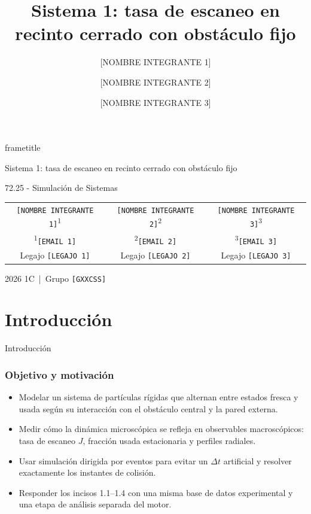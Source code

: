 \documentclass{beamer}
\title[Sistema 1 - tasa de escaneo]{Sistema 1: tasa de escaneo en recinto cerrado con obst\'aculo fijo}
\author[NOMBRE 1 - NOMBRE 2 - NOMBRE 3]{[NOMBRE INTEGRANTE 1] \and [NOMBRE INTEGRANTE 2] \and [NOMBRE INTEGRANTE 3]}
\institute[Instituto Tecnol\'ogico de Buenos Aires]{Instituto Tecnol\'ogico de Buenos Aires}
\date{}
\newcommand{\placeholder}[1]{\textcolor{tpblue}{\texttt{[#1]}}}
\newcommand{\sectiondivider}[1]{
  \begin{frame}[plain]
    \begin{center}
      \vspace{2.0cm}
      {\color{tpblue}\fontsize{23}{28}\selectfont #1\par}
    \end{center}
  \end{frame}
}
\begin{document}
\begin{frame}
  \begin{center}
    \vspace{0.05cm}
    \begin{beamercolorbox}[wd=0.85\paperwidth,sep=0.8ex,center]{frametitle}
      {\Large Sistema 1: tasa de escaneo en recinto cerrado con obst\'aculo fijo\par}
      \vspace{0.1cm}
      {\large 72.25 - Simulaci\'on de Sistemas\par}
    \end{beamercolorbox}

    \vspace{0.45cm}
    {\small
    \begin{tabular}{ccc}
      \placeholder{NOMBRE INTEGRANTE 1}\textsuperscript{1} &
      \placeholder{NOMBRE INTEGRANTE 2}\textsuperscript{2} &
      \placeholder{NOMBRE INTEGRANTE 3}\textsuperscript{3} \\
      \textsuperscript{1}\placeholder{EMAIL 1} &
      \textsuperscript{2}\placeholder{EMAIL 2} &
      \textsuperscript{3}\placeholder{EMAIL 3} \\
      Legajo \placeholder{LEGAJO 1} &
      Legajo \placeholder{LEGAJO 2} &
      Legajo \placeholder{LEGAJO 3}
    \end{tabular}\par}

    \vspace{0.35cm}
    {\large 2026 1C \,|\, Grupo \placeholder{GXXCSS}\par}

  \end{center}
\end{frame}

\section{Introducci\'on}
\sectiondivider{Introducci\'on}

\begin{frame}
  \frametitle{Objetivo y motivaci\'on}
  \begin{itemize}
    \item Modelar un sistema de part\'iculas r\'igidas que alternan entre estados fresca y usada seg\'un su interacci\'on con el obst\'aculo central y la pared externa.
    \item Medir c\'omo la din\'amica microsc\'opica se refleja en observables macrosc\'opicos: tasa de escaneo $J$, fracci\'on usada estacionaria y perfiles radiales.
    \item Usar simulaci\'on dirigida por eventos para evitar un $\Delta t$ artificial y resolver exactamente los instantes de colisi\'on.
    \item Responder los incisos 1.1--1.4 con una misma base de datos experimental y una etapa de an\'alisis separada del motor.
  \end{itemize}
\end{frame}
\end{document}
